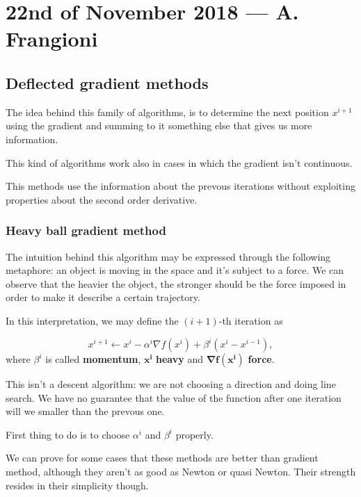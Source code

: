 \documentclass[computational_mathematics.tex]{subfiles}
\begin{document}
\section{22nd of November 2018 --- A. Frangioni}

\subsection{Deflected gradient methods}
The idea behind this family of algorithms, is to determine the next position $x^{i+1}$ using the gradient and summing to it something else that gives us more information.

This kind of algorithms work also in cases in which the gradient isn't continuous.

This methods use the information about the prevous iterations without exploiting properties about the second order derivative.

\subsubsection{Heavy ball gradient method}
The intuition behind this algorithm may be expressed through the following metaphore: an object is moving in the space and it's subject to a force. We can observe that the heavier the object, the stronger should be the force imposed in order to make it describe a certain trajectory.

In this interpretation, we may define the $(i+1)$-th iteration as 

\[
  x^{i+1} \gets x^i - \alpha^i \nabla f(x^i) + \beta^i (x^i - x^{i-1}),
\]
 where {\boldmath${\beta^i}$} is called \textbf{momentum}, $\mathbf{x^i}$ \textbf{heavy} and $\mathbf{\nabla f(x^i)}$ \textbf{force}.

This isn't a descent algorithm: we are not choosing a direction and doing line search. We have no guarantee that the value of the function after one iteration will we smaller than the prevous one.

First thing to do is to choose $\alpha^i$ and $\beta^i$ properly.

We can prove for some cases that these methods are better than gradient method, although they aren't as good as Newton or quasi Newton. Their strength resides in their simplicity though.
\end{document}
